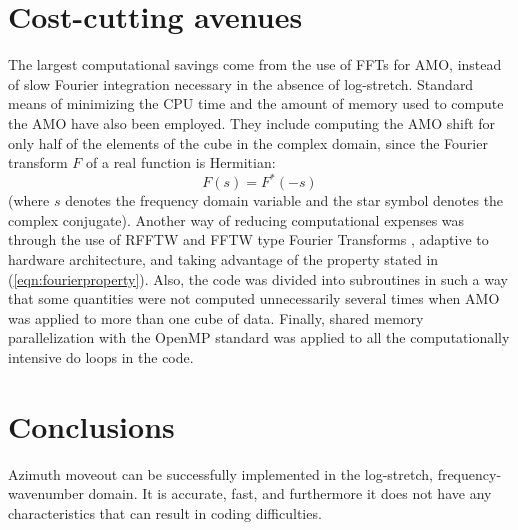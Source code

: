\section{Cost-cutting avenues}
The largest computational savings come from the use of FFTs for AMO,
instead of slow Fourier integration necessary in the absence of
log-stretch. Standard means of minimizing the CPU time and the amount of memory used
to compute the AMO have also been employed. They include computing the AMO
shift for only half of the elements of the cube in the complex domain,
since the Fourier transform $F$ of a real function is Hermitian:
\begin{equation}
\label{eqn:fourierproperty}
F(s)=F^{*}(-s)
\end{equation}
(where $s$ denotes the frequency domain variable and the star symbol
denotes the complex conjugate). Another way of reducing computational
expenses was through the use of RFFTW and FFTW type Fourier
Transforms \cite[]{fftw}, adaptive to hardware architecture, and
taking advantage of 
the property stated in (\ref{eqn:fourierproperty}). Also, the code was
divided into subroutines in such a way that some quantities
were not computed unnecessarily several times when AMO was applied to
more than one cube of data. Finally, shared memory parallelization
with the OpenMP standard was applied to all the computationally
intensive do loops in the code.

\section{Conclusions}
Azimuth moveout can be successfully implemented in the log-stretch,
frequency-wavenumber domain. It is accurate,
fast, and furthermore it does not have any characteristics that can
result in coding difficulties. 



